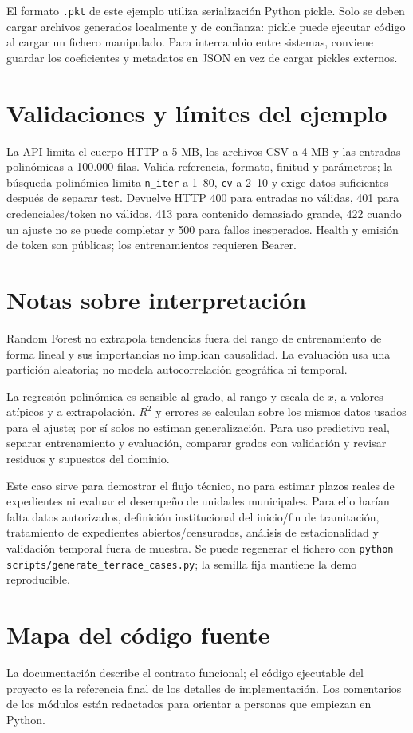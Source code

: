 \documentclass[11pt,a4paper]{article}
\begin{document}
El formato \texttt{.pkt} de este ejemplo utiliza serialización Python pickle. Solo se deben cargar archivos generados localmente y de confianza: pickle puede ejecutar código al cargar un fichero manipulado. Para intercambio entre sistemas, conviene guardar los coeficientes y metadatos en JSON en vez de cargar pickles externos.

\section{Validaciones y límites del ejemplo}
La API limita el cuerpo HTTP a 5 MB, los archivos CSV a 4 MB y las entradas polinómicas a 100.000 filas. Valida referencia, formato, finitud y parámetros; la búsqueda polinómica limita \texttt{n\_iter} a 1--80, \texttt{cv} a 2--10 y exige datos suficientes después de separar test. Devuelve HTTP 400 para entradas no válidas, 401 para credenciales/token no válidos, 413 para contenido demasiado grande, 422 cuando un ajuste no se puede completar y 500 para fallos inesperados. Health y emisión de token son públicas; los entrenamientos requieren Bearer.

\section{Notas sobre interpretación}
Random Forest no extrapola tendencias fuera del rango de entrenamiento de forma lineal y sus importancias no implican causalidad. La evaluación usa una partición aleatoria; no modela autocorrelación geográfica ni temporal.

La regresión polinómica es sensible al grado, al rango y escala de $x$, a valores atípicos y a extrapolación. $R^2$ y errores se calculan sobre los mismos datos usados para el ajuste; por sí solos no estiman generalización. Para uso predictivo real, separar entrenamiento y evaluación, comparar grados con validación y revisar residuos y supuestos del dominio.

Este caso sirve para demostrar el flujo técnico, no para estimar plazos reales de expedientes ni evaluar el desempeño de unidades municipales. Para ello harían falta datos autorizados, definición institucional del inicio/fin de tramitación, tratamiento de expedientes abiertos/censurados, análisis de estacionalidad y validación temporal fuera de muestra. Se puede regenerar el fichero con \texttt{python scripts/generate\_terrace\_cases.py}; la semilla fija mantiene la demo reproducible.

\appendix
\section{Mapa del código fuente}
La documentación describe el contrato funcional; el código ejecutable del proyecto es la referencia final de los detalles de implementación. Los comentarios de los módulos están redactados para orientar a personas que empiezan en Python.
\end{document}
